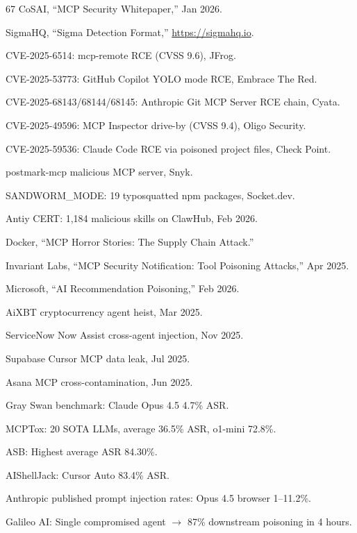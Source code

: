 \documentclass[11pt,letterpaper]{article}
\begin{document}
\begin{thebibliography}{67}
CoSAI, ``MCP Security Whitepaper,'' Jan 2026.

SigmaHQ, ``Sigma Detection Format,'' \url{https://sigmahq.io}.

CVE-2025-6514: mcp-remote RCE (CVSS 9.6), JFrog.

CVE-2025-53773: GitHub Copilot YOLO mode RCE, Embrace The Red.

CVE-2025-68143/68144/68145: Anthropic Git MCP Server RCE chain, Cyata.

CVE-2025-49596: MCP Inspector drive-by (CVSS 9.4), Oligo Security.

CVE-2025-59536: Claude Code RCE via poisoned project files, Check Point.

postmark-mcp malicious MCP server, Snyk.

SANDWORM\_MODE: 19 typosquatted npm packages, Socket.dev.

Antiy CERT: 1,184 malicious skills on ClawHub, Feb 2026.

Docker, ``MCP Horror Stories: The Supply Chain Attack.''

Invariant Labs, ``MCP Security Notification: Tool Poisoning Attacks,'' Apr 2025.

Microsoft, ``AI Recommendation Poisoning,'' Feb 2026.

AiXBT cryptocurrency agent heist, Mar 2025.

ServiceNow Now Assist cross-agent injection, Nov 2025.

Supabase Cursor MCP data leak, Jul 2025.

Asana MCP cross-contamination, Jun 2025.

Gray Swan benchmark: Claude Opus 4.5 4.7\% ASR.

MCPTox: 20 SOTA LLMs, average 36.5\% ASR, o1-mini 72.8\%.

ASB: Highest average ASR 84.30\%.

AIShellJack: Cursor Auto 83.4\% ASR.

Anthropic published prompt injection rates: Opus 4.5 browser 1--11.2\%.

Galileo AI: Single compromised agent $\rightarrow$ 87\% downstream poisoning in 4 hours.


\end{thebibliography}
\end{document}
